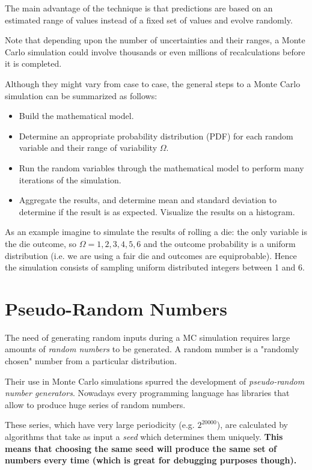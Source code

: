 The main advantage of the technique is that predictions are based on an estimated range of values instead of a fixed set of values and evolve randomly.

Note that depending upon the number of uncertainties and their ranges, a Monte Carlo simulation could involve thousands or even millions of recalculations before it is completed.

Although they might vary from case to case, the general steps to a Monte Carlo simulation can be summarized as follows:

\begin{itemize}
\item Build the mathematical model.
\item Determine an appropriate probability distribution (PDF) for each random variable and their range of variability $\Omega$.
\item Run the random variables through the mathematical model to perform many iterations of the simulation.
\item Aggregate the results, and determine mean and standard deviation to determine if the result is as expected. Visualize the results on a histogram.
\end{itemize}

As an example imagine to simulate the results of rolling a die: the only variable is the die outcome, so $\Omega =1,2,3,4,5,6$ and the outcome probability is a uniform distribution (i.e. we are using a fair die and outcomes are equiprobable). Hence the simulation consists of sampling uniform distributed integers between 1 and 6.

\section{Pseudo-Random Numbers}
\label{pseudo-random-numbers}

The need of generating random inputs during a MC simulation requires large amounts of \emph{random numbers} to be generated. A random number is a "randomly chosen" number from a particular distribution.

Their use in Monte Carlo simulations spurred the development of \emph{pseudo-random number generators}. Nowadays every programming language has libraries that allow to produce huge series of random numbers. 

These series, which have very large periodicity (e.g. $2^{20000}$), are calculated by algorithms that take as input a \emph{seed} which determines them uniquely. \textbf{This means that choosing the same seed will produce the same set of numbers every time (which is great for debugging purposes though).}

